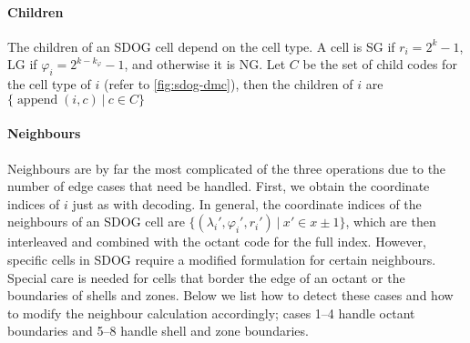 \paragraph{Children}
The children of an SDOG cell depend on the cell type.
A cell is SG if $r_i = 2^k - 1$, LG if $\varphi_i = 2^{k - k_\varphi} - 1$, and otherwise it is NG.
Let $C$ be the set of child codes for the cell type of $i$ (refer to \cref{fig:sdog-dmc}), then the children of $i$ are $\{ \operatorname{append}(i, c) \ | \ c \in C \}$


\paragraph{Neighbours}
Neighbours are by far the most complicated of the three operations due to the number of edge cases that need be handled.
First, we obtain the coordinate indices of $i$ just as with decoding.
In general, the coordinate indices of the neighbours of an SDOG cell are $\{ (\lambda_i', \varphi_i', r_i') \ | \ x' \in x \pm 1 \}$, which are then interleaved and combined with the octant code for the full index.
However, specific cells in SDOG require a modified formulation for certain neighbours.
Special care is needed for cells that border the edge of an octant or the boundaries of shells and zones.
Below we list how to detect these cases and how to modify the neighbour calculation accordingly; cases 1--4 handle octant boundaries and 5--8 handle shell and zone boundaries.
%
